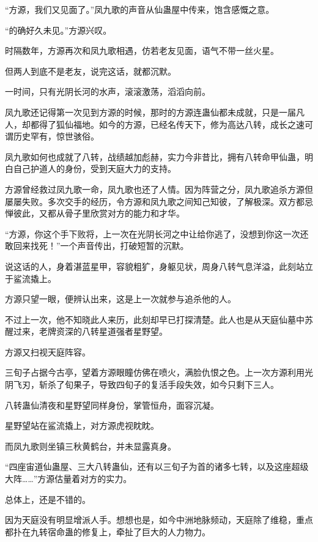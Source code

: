 
\begin{this_body}

“方源，我们又见面了。”凤九歌的声音从仙蛊屋中传来，饱含感慨之意。

“的确好久未见。”方源兴叹。

时隔数年，方源再次和凤九歌相遇，仿若老友见面，语气不带一丝火星。

但两人到底不是老友，说完这话，就都沉默。

一时间，只有光阴长河的水声，滚滚激荡，滔滔向前。

凤九歌还记得第一次见到方源的时候，那时的方源连蛊仙都未成就，只是一届凡人，却都得了狐仙福地。如今的方源，已经名传天下，修为高达八转，成长之速可谓历史罕有，惊世骇俗。

凤九歌如何也成就了八转，战绩越加彪赫，实力今非昔比，拥有八转命甲仙蛊，明白自己护道人的身份，受到天庭大力的支持。

方源曾经救过凤九歌一命，凤九歌也还了人情。因为阵营之分，凤九歌追杀方源但屡屡失败。多次交手的经历，令方源和凤九歌之间知己知彼，了解极深。双方都忌惮彼此，又都从骨子里欣赏对方的能力和才华。

“方源，你这个手下败将，上一次在光阴长河之中让给你逃了，没想到你这一次还敢回来找死！”一个声音传出，打破短暂的沉默。

说这话的人，身着湛蓝星甲，容貌粗犷，身躯见状，周身八转气息洋溢，此刻站立于鲨流撬上。

方源只望一眼，便辨认出来，这是上一次就参与追杀他的人。

不过上一次，他不知晓此人来历，此刻却早已打探清楚。此人也是从天庭仙墓中苏醒过来，老牌资深的八转星道强者星野望。

方源又扫视天庭阵容。

三旬子占据今古亭，望着方源眼瞳仿佛在喷火，满脸仇恨之色。上一次方源利用光阴飞刃，斩杀了旬果子，导致四旬子的复活手段失效，如今只剩下三人。

八转蛊仙清夜和星野望同样身份，掌管恒舟，面容沉凝。

星野望站在鲨流撬上，对方源虎视眈眈。

而凤九歌则坐镇三秋黄鹤台，并未显露真身。

“四座宙道仙蛊屋、三大八转蛊仙，还有以三旬子为首的诸多七转，以及这座超级大阵……”方源估量着对方的实力。

总体上，还是不错的。

因为天庭没有明显增派人手。想想也是，如今中洲地脉频动，天庭除了维稳，重点都扑在九转宿命蛊的修复上，牵扯了巨大的人力物力。


\end{this_body}
